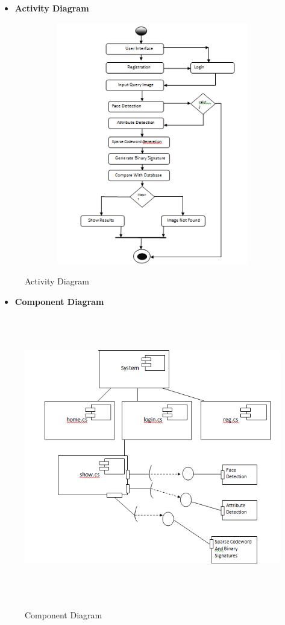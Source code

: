 \begin{itemize}
\item \textbf {Activity Diagram}
\end{itemize}

\begin{figure}[ht!]
	\centering
\includegraphics[height=300pt,width=435pt]{acti.png}\\
\caption{Activity Diagram}
\end{figure}
\newline\newline
\begin{itemize}
\item \textbf {Component Diagram}
\end{itemize}

\begin{figure}[ht!]
	\centering
\includegraphics[height=350pt,width=435pt]{comp.png}\\
\caption{Component Diagram}
\end{figure}
\newpage

